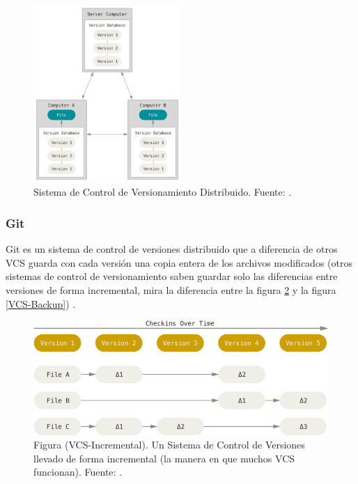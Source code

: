 \begin{figure}
  \begin{center}
      \includegraphics[width=0.5\textwidth]{Figures/dvcs.png}
  \end{center}
  \caption{Sistema de Control de Versionamiento Distribuido. Fuente: \citep{PROGIT-Git-VCS}.}
  \label{DVCS}
\end{figure}

\subsubsection{Git}
Git es un sistema de control de versiones distribuido que a diferencia de otros VCS guarda con cada versión una copia entera de los archivos modificados (otros sistemas de control de versionamiento saben guardar solo las diferencias entre versiones de forma incremental, mira la diferencia entre la figura \ref{VCS-Incremental} y la figura \ref{VCS-Backup}) \citep{PROGIT-Git-Intro}.

\begin{figure}
  \begin{center}
      \includegraphics[width=\textwidth]{Figures/vcs-incremental.png}
  \end{center}
  \caption{Figura (VCS-Incremental). Un Sistema de Control de Versiones llevado de forma incremental (la manera en que muchos VCS funcionan). Fuente: \citep{PROGIT-Git-Intro}.}
  \label{VCS-Incremental}
\end{figure}

